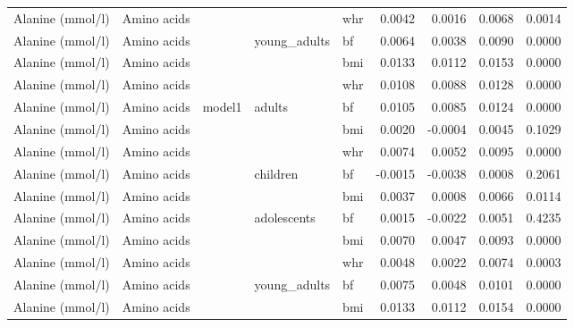 \documentclass[11pt,twoside]{bristolthesis}
\begin{document}
\begin{longtable}[t]{lllllrrrr}
\cmidrule{1-2}
\cmidrule{5-9}\nopagebreak
Alanine (mmol/l) & Amino acids &  &  & whr & 0.0042 & 0.0016 & 0.0068 & 0.0014\\
\cmidrule{1-2}
\cmidrule{5-9}\nopagebreak
Alanine (mmol/l) & Amino acids &  & \multirow{-3}{*}{\raggedright\arraybackslash young\_adults} & bf & 0.0064 & 0.0038 & 0.0090 & 0.0000\\
\cmidrule{1-2}
\cmidrule{4-9}\nopagebreak
Alanine (mmol/l) & Amino acids &  &  & bmi & 0.0133 & 0.0112 & 0.0153 & 0.0000\\
\cmidrule{1-2}
\cmidrule{5-9}\nopagebreak
Alanine (mmol/l) & Amino acids &  &  & whr & 0.0108 & 0.0088 & 0.0128 & 0.0000\\
\cmidrule{1-2}
\cmidrule{5-9}\nopagebreak
Alanine (mmol/l) & Amino acids & \multirow{-11}{*}{\raggedright\arraybackslash model1} & \multirow{-3}{*}{\raggedright\arraybackslash adults} & bf & 0.0105 & 0.0085 & 0.0124 & 0.0000\\
\cmidrule{1-9}\pagebreak[0]
Alanine (mmol/l) & Amino acids &  &  & bmi & 0.0020 & -0.0004 & 0.0045 & 0.1029\\
\cmidrule{1-2}
\cmidrule{5-9}\nopagebreak
Alanine (mmol/l) & Amino acids &  &  & whr & 0.0074 & 0.0052 & 0.0095 & 0.0000\\
\cmidrule{1-2}
\cmidrule{5-9}\nopagebreak
Alanine (mmol/l) & Amino acids &  & \multirow{-3}{*}{\raggedright\arraybackslash children} & bf & -0.0015 & -0.0038 & 0.0008 & 0.2061\\
\cmidrule{1-2}
\cmidrule{4-9}\nopagebreak
Alanine (mmol/l) & Amino acids &  &  & bmi & 0.0037 & 0.0008 & 0.0066 & 0.0114\\
\cmidrule{1-2}
\cmidrule{5-9}\nopagebreak
Alanine (mmol/l) & Amino acids &  & \multirow{-2}{*}{\raggedright\arraybackslash adolescents} & bf & 0.0015 & -0.0022 & 0.0051 & 0.4235\\
\cmidrule{1-2}
\cmidrule{4-9}\nopagebreak
Alanine (mmol/l) & Amino acids &  &  & bmi & 0.0070 & 0.0047 & 0.0093 & 0.0000\\
\cmidrule{1-2}
\cmidrule{5-9}\nopagebreak
Alanine (mmol/l) & Amino acids &  &  & whr & 0.0048 & 0.0022 & 0.0074 & 0.0003\\
\cmidrule{1-2}
\cmidrule{5-9}\nopagebreak
Alanine (mmol/l) & Amino acids &  & \multirow{-3}{*}{\raggedright\arraybackslash young\_adults} & bf & 0.0075 & 0.0048 & 0.0101 & 0.0000\\
\cmidrule{1-2}
\cmidrule{4-9}\nopagebreak
Alanine (mmol/l) & Amino acids &  &  & bmi & 0.0133 & 0.0112 & 0.0154 & 0.0000\\

\end{longtable}
\end{document}
